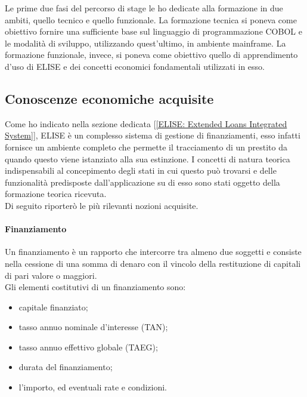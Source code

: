 Le prime due fasi del percorso di stage le ho dedicate alla formazione in due ambiti, quello tecnico e quello funzionale. La formazione tecnica si poneva come obiettivo fornire una sufficiente base sul linguaggio di programmazione COBOL e le modalità di sviluppo, utilizzando quest'ultimo, in ambiente mainframe. La formazione funzionale, invece, si poneva come obiettivo quello di apprendimento d'uso di ELISE e dei concetti economici fondamentali utilizzati in esso.

\subsection{Conoscenze economiche acquisite}

Come ho indicato nella sezione dedicata [\ref{ELISE: Extended Loans Integrated System}], ELISE è un complesso sistema di gestione di finanziamenti, esso infatti fornisce un ambiente completo che permette il tracciamento di un prestito da quando questo viene istanziato alla sua estinzione. I concetti di natura teorica indispensabili al concepimento degli stati in cui questo può trovarsi e delle funzionalità predisposte dall'applicazione su di esso sono stati oggetto della formazione teorica ricevuta.\\

Di seguito riporterò le più rilevanti nozioni acquisite.

\paragraph{Finanziamento}
Un finanziamento è un rapporto che intercorre tra almeno due soggetti e consiste nella cessione di una somma di denaro con il vincolo della restituzione di capitali di pari valore o maggiori.\\
Gli elementi costitutivi di un finanziamento sono:
	\begin{itemize}
		\item capitale finanziato;
		\item tasso annuo nominale d'interesse (TAN);
		\item tasso annuo effettivo globale (TAEG);
		\item durata del finanziamento;
		\item l'importo, ed eventuali rate e condizioni.	
	\end{itemize}

